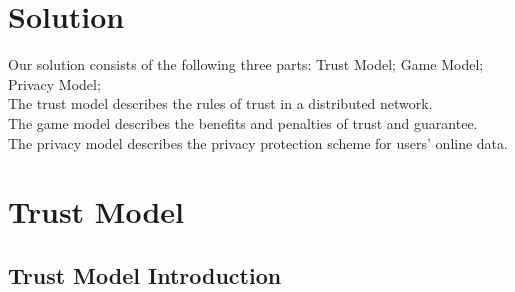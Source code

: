 \documentclass{article}
\begin{document}
\section{Solution}

Our solution consists of the following three parts: Trust Model; Game Model; Privacy Model;\\
The trust model describes the rules of trust in a distributed network.\\
The game model describes the benefits and penalties of trust and guarantee.\\
The privacy model describes the privacy protection scheme for users{'} online data.


\section{Trust Model}


\subsection{Trust Model Introduction}
\end{document}
